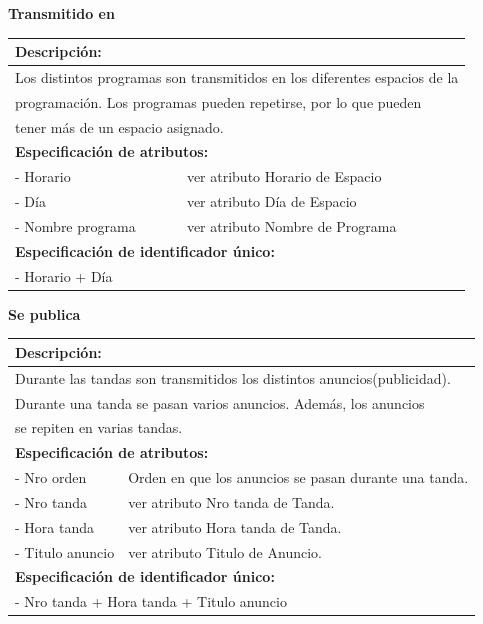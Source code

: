 \documentclass[a4paper,10pt]{article}
\begin{document}
    \begin{flushleft}
      \begin{large} \bf{Transmitido en} \end{large}
    \end{flushleft}
      \begin{tabular}{| p{2cm} | p{9cm} |}
	\hline
	\multicolumn{2}{|l|}{\bf{Descripci\'on:}} \\
	\hline
	\multicolumn{2}{|l|}{Los distintos programas son transmitidos en los diferentes espacios de la } \\
	\multicolumn{2}{|l|}{programaci\'on. Los programas pueden repetirse, por lo que pueden } \\	
	\multicolumn{2}{|l|}{tener m\'as de un espacio asignado.} \\	
	\hline
	\multicolumn{2}{|l|}{\bf{Especificaci\'on de atributos:}} \\
	\hline
	- Horario & ver atributo Horario de Espacio \\
	\hline \hline
	- D\'ia & ver atributo D\'ia de Espacio\\
	\hline \hline
	- Nombre \newline programa & ver atributo Nombre de Programa \\
	\hline
	\multicolumn{2}{|l|}{\bf{Especificaci\'on de identificador \'unico:}} \\
	\hline
	\multicolumn{2}{|l|}{- Horario + D\'ia } \\
	\hline
      \end{tabular}
      
      
    \begin{flushleft}
      \begin{large} \bf{Se publica} \end{large}
    \end{flushleft}
      \begin{tabular}{| p{2cm} | p{9cm} |}
	\hline
	\multicolumn{2}{|l|}{\bf{Descripci\'on:}} \\
	\hline
	\multicolumn{2}{|l|}{Durante las tandas son transmitidos los distintos anuncios(publicidad).} \\
	\multicolumn{2}{|l|}{Durante una tanda se pasan varios anuncios. Adem\'as, los anuncios } \\	
	\multicolumn{2}{|l|}{se repiten en varias tandas.} \\
	\hline
	\multicolumn{2}{|l|}{\bf{Especificaci\'on de atributos:}} \\
	\hline
	- Nro orden & Orden en que los anuncios se pasan durante una tanda. \\
	\hline \hline
	- Nro tanda & ver atributo Nro tanda de Tanda. \\
	\hline \hline
	- Hora tanda & ver atributo Hora tanda de Tanda. \\
	\hline \hline
	- Titulo \newline anuncio & ver atributo Titulo de Anuncio. \\
	\hline
	\multicolumn{2}{|l|}{\bf{Especificaci\'on de identificador \'unico:}} \\
	\hline
	\multicolumn{2}{|l|}{- Nro tanda + Hora tanda + Titulo anuncio} \\
	\hline
      \end{tabular}
\end{document}
